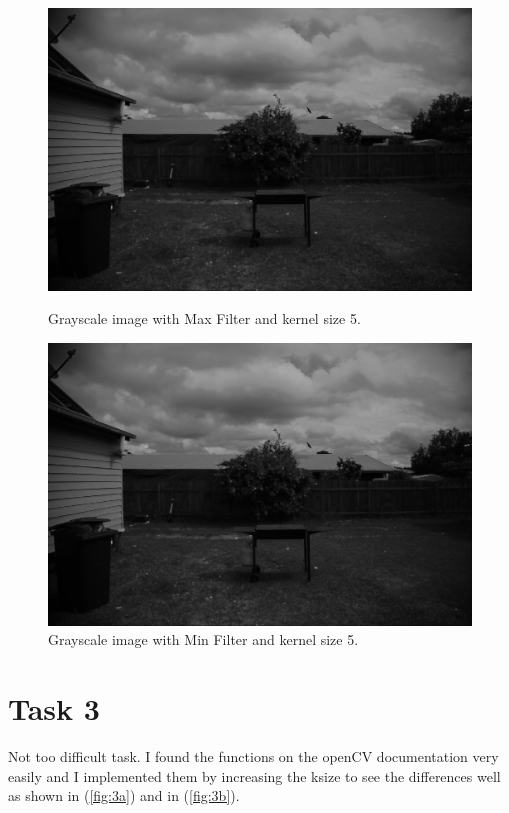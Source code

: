 \begin{figure}[h]
	\centering
	\begin{minipage}{0.45\textwidth}
		\centering
		\includegraphics[width=\linewidth]{images/source/task2/1_max_5}
		\caption{Grayscale image with Max Filter and kernel size 5.}
		\label{fig:2a}
        \end{minipage}
        \hspace{0.05\textwidth}
        \begin{minipage}{0.45\textwidth}
        		\centering
		\includegraphics[width=\linewidth]{images/source/task2/1_min_5}
		\caption{Grayscale image with Min Filter and kernel size 5.}
		\label{fig:2b}
        \end{minipage}
\end{figure}

\chapter{Task 3}
Not too difficult task. I found the functions on the openCV documentation very easily and I implemented them by increasing the ksize to see the differences well as shown in  (\ref{fig:3a}) and in  (\ref{fig:3b}).

